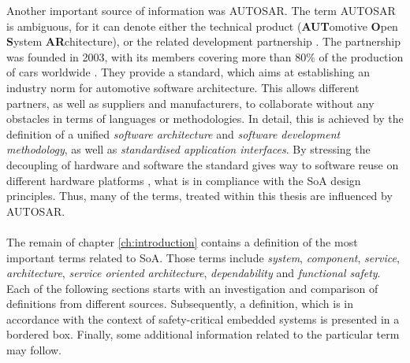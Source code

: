 Another important source of information was AUTOSAR. The term AUTOSAR is ambiguous, for it can denote either the technical product (\textbf{AUT}omotive \textbf{O}pen \textbf{S}ystem \textbf{AR}chitecture), or the related development partnership \cite{autosar_rs_main}. The partnership was founded in 2003, with its members covering more than 80\% of the production of cars worldwide \cite{kirschke_biller2011} \cite{schmerler2012}. They provide a standard, which aims at establishing an industry norm for automotive software architecture. This allows different partners, as well as suppliers and manufacturers, to collaborate without any obstacles in terms of languages or methodologies. In detail, this is achieved by the definition of a unified \emph{software architecture} and \emph{software development methodology}, as well as \emph{standardised application interfaces}. By stressing the decoupling of hardware and software the standard gives way to software reuse on different hardware platforms \cite{kirschke_biller2011} \cite{schmerler2012}, what is in compliance with the SoA design principles. Thus, many of the terms, treated within this thesis are influenced by AUTOSAR.
\\
\\
The remain of chapter \ref{ch:introduction} contains a definition of the most important terms related to SoA. Those terms include \emph{system}, \emph{component}, \emph{service}, \emph{architecture}, \emph{service oriented architecture}, \emph{dependability} and \emph{functional safety}. Each of the following sections starts with an investigation and comparison of definitions from different sources. Subsequently, a definition, which is in accordance with the context of safety-critical embedded systems is presented in a bordered box. Finally, some additional information related to the particular term may follow.